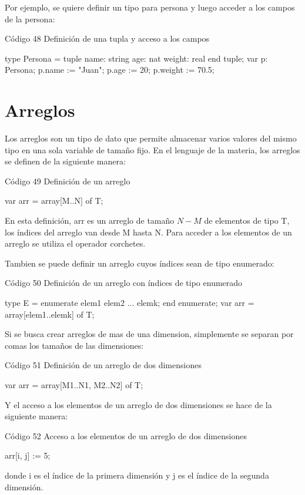 Por ejemplo, se quiere definir un tipo para persona y luego acceder a los campos de la persona:
\begin{codebox}{Código 48}
\footnotesize Definición de una tupla y acceso a los campos
\tcblower
\begin{pascallike}
type Persona = tuple
                name: string
                age: nat
                weight: real
            end tuple;
var p: Persona;
p.name := "Juan";
p.age := 20;
p.weight := 70.5;
\end{pascallike}
\end{codebox}

\section{Arreglos}
Los arreglos son un tipo de dato que permite almacenar varios valores del mismo tipo en una sola variable de tamaño fijo. En el lenguaje de la materia, los arreglos se definen de la siguiente manera:
\begin{codebox}{Código 49}
\footnotesize Definición de un arreglo
\tcblower
\begin{pascallike}
var arr = array[M..N] of T;
\end{pascallike}
\end{codebox}
En esta definición, arr es un arreglo de tamaño $N-M$ de elementos de tipo T, los índices del arreglo van desde M hasta N. Para acceder a los elementos de un arreglo se utiliza el operador corchetes.

Tambien se puede definir un arreglo cuyos índices sean de tipo enumerado:
\begin{codebox}{Código 50}
\footnotesize Definición de un arreglo con índices de tipo enumerado
\tcblower
\begin{pascallike}
type E = enumerate
            elem1
            elem2
            ...
            elemk;
        end enumerate;
var arr = array[elem1..elemk] of T;
\end{pascallike}
\end{codebox}
Si se busca crear arreglos de mas de una dimension, simplemente se separan por comas los tamaños de las dimensiones:
\begin{codebox}{Código 51}
\footnotesize Definición de un arreglo de dos dimensiones
\tcblower
\begin{pascallike}
var arr = array[M1..N1, M2..N2] of T;
\end{pascallike}
\end{codebox}
Y el acceso a los elementos de un arreglo de dos dimensiones se hace de la siguiente manera:
\begin{codebox}{Código 52}
\footnotesize Acceso a los elementos de un arreglo de dos dimensiones
\tcblower
\begin{pascallike}
arr[i, j] := 5;
\end{pascallike}
\end{codebox}
donde i es el índice de la primera dimensión y j es el índice de la segunda dimensión.

